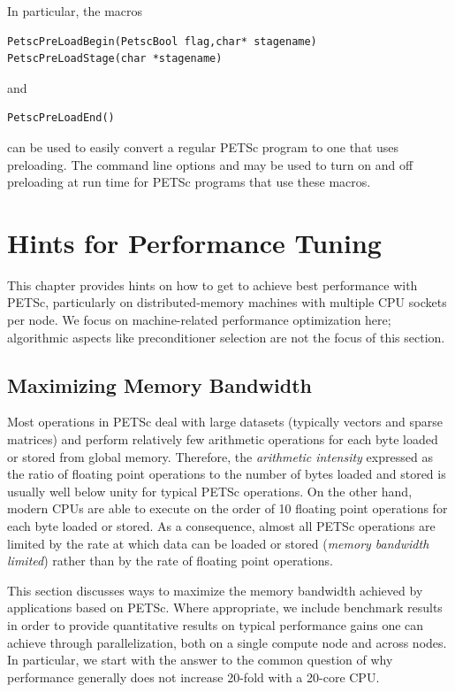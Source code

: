 {{In particular, the macros
\begin{lstlisting}
PetscPreLoadBegin(PetscBool flag,char* stagename)
PetscPreLoadStage(char *stagename)
\end{lstlisting}
and
\begin{lstlisting}
PetscPreLoadEnd()
\end{lstlisting}
can be used to easily
convert a regular PETSc program to one that uses preloading. The command line options
  and   may be used to turn on and off
preloading at run time for PETSc programs that use these macros. 

\cleardoublepage
\chapter{Hints for Performance Tuning}
\label{ch_performance} \hypertarget{ch_performance}{}

This chapter provides hints on how to get to achieve best performance with PETSc, particularly on distributed-memory machines with multiple CPU sockets per node.
We focus on machine-related performance optimization here; algorithmic aspects like preconditioner selection are not the focus of this section.

\section{Maximizing Memory Bandwidth}

Most operations in PETSc deal with large datasets (typically vectors and sparse matrices) and perform relatively few arithmetic operations for each byte loaded or stored from global memory.
Therefore, the \emph{arithmetic intensity} expressed as the ratio of floating point operations to the number of bytes loaded and stored is usually well below unity for typical PETSc operations.
On the other hand, modern CPUs are able to execute on the order of 10 floating point operations for each byte loaded or stored.
As a consequence, almost all PETSc operations are limited by the rate at which data can be loaded or stored (\emph{memory bandwidth limited}) rather than by the rate of floating point operations.

This section discusses ways to maximize the memory bandwidth achieved by applications based on PETSc.
Where appropriate, we include benchmark results in order to provide quantitative results on typical performance gains one can achieve through parallelization, both on a single compute node and across nodes.
In particular, we start with the answer to the common question of why performance generally does not increase 20-fold with a 20-core CPU.

}}
